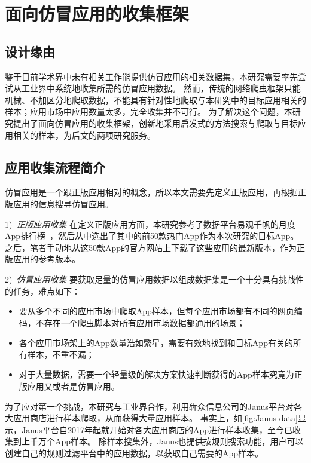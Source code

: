 \chapter{面向仿冒应用的收集框架\mytool}
\label{chp:fakerevealer}

\section{设计缘由}
鉴于目前学术界中未有相关工作能提供仿冒应用的相关数据集，本研究需要率先尝试从工业界中系统地收集所需的仿冒应用数据。
然而，传统的网络爬虫框架只能机械、不加区分地爬取数据，不能具有针对性地爬取与本研究中的目标应用相关的样本；应用市场中应用数量太多，完全收集并不可行。
为了解决这个问题，本研究提出了面向仿冒应用的收集框架\mytool，创新地采用启发式的方法搜索与爬取与目标应用相关的样本，为后文的两项研究服务。

\section{应用收集流程简介}
仿冒应用是一个跟正版应用相对的概念，所以本文需要先定义正版应用，再根据正版应用的信息搜寻仿冒应用。

1)\ \emph{正版应用收集} \quad
在定义正版应用方面，本研究参考了数据平台易观千帆的月度App排行榜~\cite{yiguanqianfan}，然后从中选出了其中的前50款热门App作为本次研究的目标App。
之后，笔者手动地从这50款App的官方网站上下载了这些应用的最新版本，作为正版应用的参考版本。

2)\ \emph{仿冒应用收集} \quad
要获取足量的仿冒应用数据以组成数据集是一个十分具有挑战性的任务，难点如下：
\begin{itemize}
	\item 要从多个不同的应用市场中爬取App样本，但每个应用市场都有不同的网页编码，不存在一个爬虫脚本对所有应用市场数据都通用的场景；
	\item 各个应用市场架上的App数量浩如繁星，需要有效地找到和目标App有关的所有样本，不重不漏；
	\item 对于大量数据，需要一个轻量级的解决方案快速判断获得的App样本究竟为正版应用又或者是仿冒应用。
\end{itemize}

为了应对第一个挑战，本研究与工业界合作，利用犇众信息公司的Janus平台对各大应用商店进行样本爬取，从而获得大量应用样本。
事实上，如\autoref{fig:Janus-data}显示，Janus平台自2017年起就开始对各大应用商店的App进行样本收集，至今已收集到上千万个App样本。
除样本搜集外，Janus也提供按规则搜索功能，用户可以创建自己的规则过滤平台中的应用数据，以获取自己需要的App样本。

